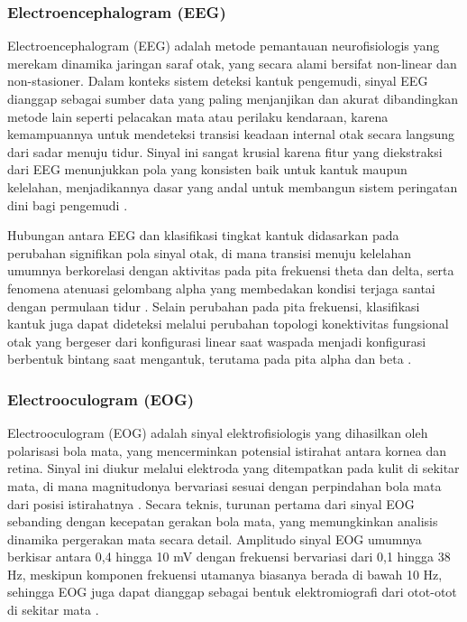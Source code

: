 \subsubsection{Electroencephalogram (EEG)} \label{II.Teori1.1}
Electroencephalogram (EEG) adalah metode pemantauan neurofisiologis yang merekam dinamika jaringan saraf otak, yang secara alami bersifat non-linear dan non-stasioner. Dalam konteks sistem deteksi kantuk pengemudi, sinyal EEG dianggap sebagai sumber data yang paling menjanjikan dan akurat dibandingkan metode lain seperti pelacakan mata atau perilaku kendaraan, karena kemampuannya untuk mendeteksi transisi keadaan internal otak secara langsung dari sadar menuju tidur. Sinyal ini sangat krusial karena fitur yang diekstraksi dari EEG menunjukkan pola yang konsisten baik untuk kantuk maupun kelelahan, menjadikannya dasar yang andal untuk membangun sistem peringatan dini bagi pengemudi \cite{s21113786}.

Hubungan antara EEG dan klasifikasi tingkat kantuk didasarkan pada perubahan signifikan pola sinyal otak, di mana transisi menuju kelelahan umumnya berkorelasi dengan aktivitas pada pita frekuensi theta dan delta, serta fenomena atenuasi gelombang alpha yang membedakan kondisi terjaga santai dengan permulaan tidur \cite{JIAO2020100}. Selain perubahan pada pita frekuensi, klasifikasi kantuk juga dapat dideteksi melalui perubahan topologi konektivitas fungsional otak yang bergeser dari konfigurasi linear saat waspada menjadi konfigurasi berbentuk bintang saat mengantuk, terutama pada pita alpha dan beta \cite{s21113786}.

\subsubsection{Electrooculogram (EOG)} \label{II.Teori1.1}
Electrooculogram (EOG) adalah sinyal elektrofisiologis yang dihasilkan oleh polarisasi bola mata, yang mencerminkan potensial istirahat antara kornea dan retina. Sinyal ini diukur melalui elektroda yang ditempatkan pada kulit di sekitar mata, di mana magnitudonya bervariasi sesuai dengan perpindahan bola mata dari posisi istirahatnya \cite{malmivuo1995bioelectromagnetism}. Secara teknis, turunan pertama dari sinyal EOG sebanding dengan kecepatan gerakan bola mata, yang memungkinkan analisis dinamika pergerakan mata secara detail. Amplitudo sinyal EOG umumnya berkisar antara 0,4 hingga 10 mV dengan frekuensi bervariasi dari 0,1 hingga 38 Hz, meskipun komponen frekuensi utamanya biasanya berada di bawah 10 Hz, sehingga EOG juga dapat dianggap sebagai bentuk elektromiografi dari otot-otot di sekitar mata \cite{SONG2020101865}.


